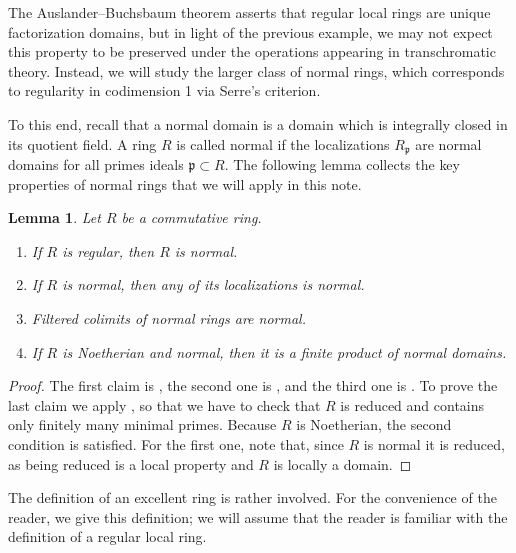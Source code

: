 \documentclass[oneside]{amsart}
\newtheorem{lem}[thm]{Lemma}
\theoremstyle{definition}
\theoremstyle{remark}
\theoremstyle{theorem}
\numberwithin{equation}{section}
\newcommand{\fp}{\mathfrak{p}}
\begin{document}
The Auslander--Buchsbaum theorem asserts that regular local rings are unique factorization domains, but in light of the previous example, we may not expect this property to be preserved under the operations appearing in transchromatic theory. Instead, we will study the larger class of normal rings, which corresponds to regularity in codimension 1 via Serre's criterion. 

To this end, recall that a normal domain is a domain which is integrally closed in its quotient field. A ring $R$ is called normal if the localizations $R_{\fp}$ are normal domains for all primes ideals $\fp \subset R$. The following lemma collects the key properties of normal rings that we will apply in this note.

\begin{lem}\label{lem:normal}
Let $R$ be a commutative ring.
\begin{enumerate}
	\item If $R$ is regular, then $R$ is normal.
	\item If $R$ is normal, then any of its localizations is normal.
	\item Filtered colimits of normal rings are normal.
	\item If $R$ is Noetherian and normal, then it is a finite product of normal domains.
\end{enumerate}
\end{lem}
\begin{proof}
The first claim is \cite[Tag 0567]{stacks-project}, the second one is \cite[Tag 037C]{stacks-project}, and the third one is \cite[Tag 037D]{stacks-project}. To prove the last claim we apply \cite[Tag 030C]{stacks-project}, so that we have to check that $R$ is reduced and contains only finitely many minimal primes. Because $R$ is Noetherian, the second condition is satisfied. For the first one, note that, since $R$ is normal it is reduced, as being reduced is a local property and $R$ is locally a domain. 
\end{proof}

The definition of an excellent ring is rather involved. For the convenience of the reader, we give this definition; we will assume that the reader is familiar with the definition of a regular local ring. 
\end{document}
